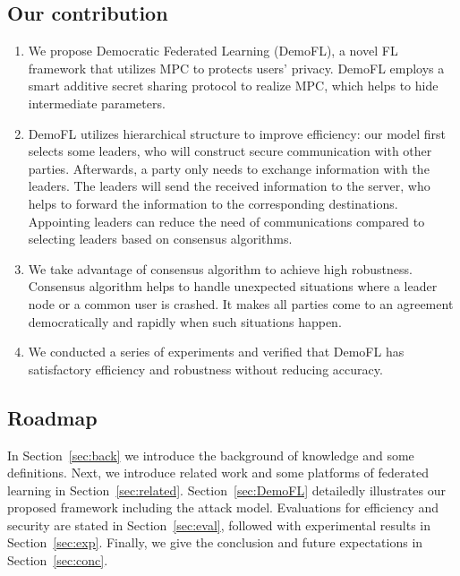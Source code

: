 \subsection{Our contribution}
\begin{enumerate}
    \item We propose Democratic Federated Learning (DemoFL), a novel FL framework that utilizes MPC to protects users' privacy. DemoFL employs a smart additive secret sharing protocol to realize MPC, which helps to hide intermediate parameters.

    \item DemoFL utilizes hierarchical structure to improve efficiency: our model first selects some leaders, who will construct secure communication with other parties. Afterwards, a party only needs to exchange information with the leaders. The leaders will send the received information to the server, who helps to forward the information to the corresponding destinations. Appointing leaders can reduce the need of communications compared to selecting leaders based on consensus algorithms.

    \item We take advantage of consensus algorithm to achieve high robustness. Consensus algorithm helps to handle unexpected situations where a leader node or a common user is crashed. It makes all parties come to an agreement democratically and rapidly when such situations happen.

    \item We conducted a series of experiments and verified that DemoFL has satisfactory efficiency and robustness without reducing accuracy.

\end{enumerate}

\subsection{Roadmap} In Section~\ref{sec:back} we introduce the background of knowledge and some definitions. Next, we introduce related work and some platforms of federated learning in Section~\ref{sec:related}. Section~\ref{sec:DemoFL} detailedly illustrates our proposed framework including the attack model. Evaluations for efficiency and security are stated in Section~\ref{sec:eval}, followed with experimental results in Section~\ref{sec:exp}. Finally, we give the conclusion and future expectations in Section~\ref{sec:conc}.